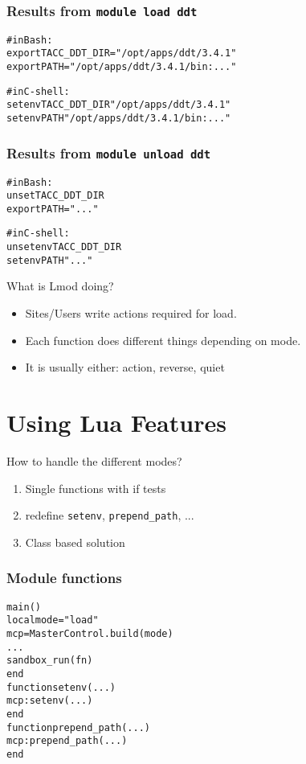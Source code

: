 \documentclass{beamer}
\begin{document}
\begin{frame}[fragile]
    \frametitle{Results from \texttt{module load ddt}}
    {\small
      \begin{alltt}
          # in Bash:
          export TACC_DDT_DIR="/opt/apps/ddt/3.4.1"
          export PATH="/opt/apps/ddt/3.4.1/bin:..."

          # in C-shell:
          setenv TACC_DDT_DIR "/opt/apps/ddt/3.4.1"
          setenv PATH         "/opt/apps/ddt/3.4.1/bin:..."
      \end{alltt}
    }
\end{frame}    

\begin{frame}[fragile]
    \frametitle{Results from \texttt{module unload ddt}}
    {\small
      \begin{alltt}
          # in Bash:
          unset TACC_DDT_DIR
          export PATH="..."

          # in C-shell:
          unsetenv TACC_DDT_DIR
          setenv   PATH         "..."
      \end{alltt}
    }
\end{frame}    

\begin{frame}{What is Lmod doing?}
  \begin{itemize}
    \item Sites/Users write actions required for load.
    \item Each function does different things depending on mode.
    \item It is usually either: action, reverse, quiet
  \end{itemize}
\end{frame}

\section{Using Lua Features}

\begin{frame}{How to handle the different modes?}
  \begin{enumerate}
    \item Single functions with if tests
    \item redefine \texttt{setenv}, \texttt{prepend\_path}, ...
    \item Class based solution
  \end{enumerate}
\end{frame}

\begin{frame}[fragile]
    \frametitle{Module functions}
    {\small
      \begin{alltt}
          main()
            local mode = "load"
            mcp = MasterControl.build(mode)
            ...
            sandbox_run(fn)
          end
          function setenv(...)
             mcp:setenv(...)
          end       
          function prepend_path(...)
             mcp:prepend_path(...)
          end       
      \end{alltt}
    }
\end{frame}    
\end{document}
